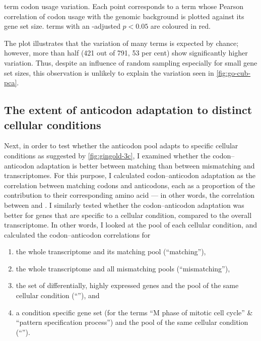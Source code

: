     {\go term codon usage variation.}
    {Each point corresponds to a \go term whose Pearson correlation of codon
    usage with the genomic background is plotted against its gene set size.
    \go terms with an \fdr-adjusted \(p < 0.05\) are coloured in red.}

The plot illustrates that the variation of many \go terms is expected by chance;
however, more than half (\num{421} out of \num{791}, \num{53} per cent) show
significantly higher variation. Thus, despite an influence of random sampling
especially for small gene set sizes, this observation is unlikely to explain the
variation seen in \cref{fig:go-cub-pca}.

\subsection{The extent of anticodon adaptation to distinct cellular conditions}

Next, in order to test whether the anticodon pool adapts to specific cellular
conditions as suggested by \cref{fig:gingold-3c}, I examined whether the
codon--anticodon adaptation is better between matching than between mismatching
\mrna and \trna transcriptomes. For this purpose, I calculated codon--anticodon
adaptation as the correlation between matching codons and anticodons, each as a
proportion of the contribution to their corresponding amino acid --- in other
words, the correlation between \rcu and \raa. I similarly tested whether the
codon--anticodon adaptation was better for genes that are specific to a cellular
condition, compared to the overall transcriptome. In other words, I looked at
the \mrna pool of each cellular condition, and calculated the codon--anticodon
correlations for

\begin{enumerate}
    \item the whole transcriptome and its matching \trna pool (“matching”),
    \item the whole transcriptome and all mismatching \trna pools
        (“mismatching”),
    \item the set of differentially, highly expressed \mrna genes and the
        \trna pool of the same cellular condition (“”), and
    \item a condition specific gene set (for the \go terms “M phase of mitotic
        cell cycle” \& “pattern specification process”) and the \trna pool of
        the same cellular condition (“”).
\end{enumerate}

